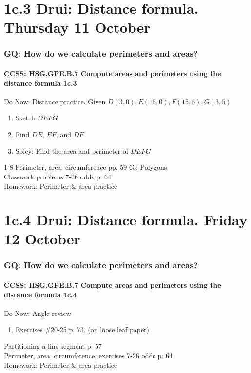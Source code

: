 \documentclass{beamer}
\begin{document}
\section{1c.3 Drui: Distance formula. Thursday 11 October}
  \frame
  {
    \frametitle{GQ: How do we calculate perimeters and areas?}
    \framesubtitle{CCSS: HSG.GPE.B.7 Compute areas and perimeters using the distance formula  \alert{1c.3}}

    \begin{block}{Do Now: Distance practice. Given $D(3,0), E(15,0), F(15,5), G(3,5)$}
    \begin{enumerate}
        \item Sketch $DEFG$
        \item Find $DE$, $EF$, and $DF$
        \item Spicy: Find the area and perimeter of $DEFG$
    \end{enumerate}
    \end{block}
    1-8 Perimeter, area, circumference pp. 59-63; Polygons\\
    Classwork problems 7-26 odds p. 64\\
    \vspace{0.5cm}
    Homework: Perimeter \& area practice
  }

\section{1c.4 Drui: Distance formula. Friday 12 October}
  \frame
  {
    \frametitle{GQ: How do we calculate perimeters and areas?}
    \framesubtitle{CCSS: HSG.GPE.B.7 Compute areas and perimeters using the distance formula  \alert{1c.4}}

    \begin{block}{Do Now: Angle review}
    \begin{enumerate}
        \item Exercises \#20-25 p. 73. (on loose leaf paper)
    \end{enumerate}
    \end{block}
    Partitioning a line segment p. 57\\
    Perimeter, area, circumference, exercises 7-26 odds p. 64\\
    \vspace{0.5cm}
    Homework: Perimeter \& area practice
  }
\end{document}
